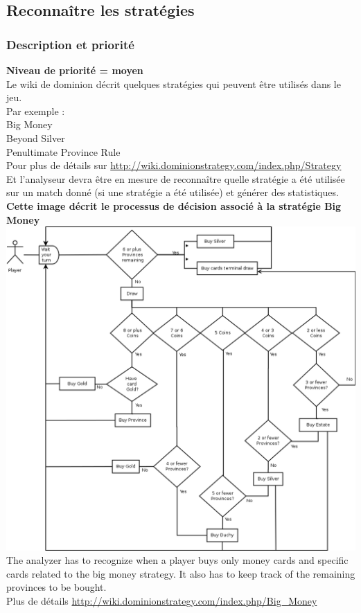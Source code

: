 \documentclass{scrreprt}
\begin{document}
\subsection{Reconnaître les stratégies}
\subsubsection{Description et priorité}
\textbf{Niveau de priorité = moyen}\\

Le wiki de dominion décrit quelques stratégies qui peuvent être utilisés dans le jeu.\\Par exemple :\\
Big Money\\
Beyond Silver\\
Penultimate Province Rule\\
Pour plus de détails sur \url{http://wiki.dominionstrategy.com/index.php/Strategy}\\

Et l'analyseur devra être en mesure de reconnaître quelle stratégie a été utilisée sur un match donné (si une  stratégie a été utilisée) et générer des statistiques.\\

\textbf{Cette image décrit le processus de décision associé à la stratégie Big Money}\\
\includegraphics[width=\textwidth,height=\textheight,keepaspectratio]{big-money}\\
The analyzer has to recognize when a player buys only money cards and specific cards related to the big money strategy. It also has to keep track of the remaining provinces to be bought.\\
Plus de détails \url{http://wiki.dominionstrategy.com/index.php/Big_Money}\\
\end{document}
